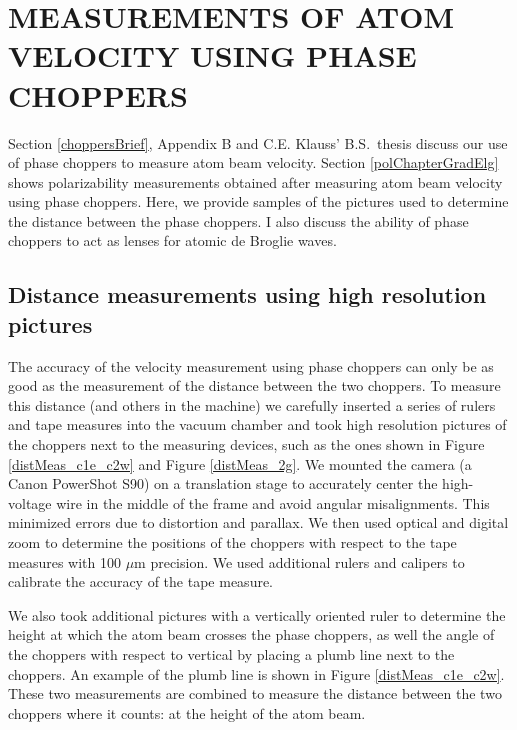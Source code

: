\chapter{MEASUREMENTS OF ATOM VELOCITY USING PHASE CHOPPERS}
\label{choppersChapter}

Section \ref{choppersBrief}, Appendix B and C.E. Klauss' B.S.~thesis \cite{Kla11} discuss our use of phase choppers to measure atom beam velocity. Section \ref{polChapterGradElg} shows polarizability measurements obtained after measuring atom beam velocity using phase choppers. Here, we provide samples of the pictures used to determine the distance between the phase choppers. I also discuss the ability of phase choppers to act as lenses for atomic de Broglie waves.




\section{Distance measurements using high resolution pictures}
\label{distMeasurements}
The accuracy of the velocity measurement using phase choppers can only be as good as the measurement of the distance between the two choppers. To measure this distance (and others in the machine) we carefully inserted a series of rulers and tape measures into the vacuum chamber and took high resolution pictures of the choppers next to the measuring devices, such as the ones shown in Figure \ref{distMeas_c1e_c2w} and Figure \ref{distMeas_2g}. We mounted the camera (a Canon PowerShot S90) on a translation stage to accurately center the high-voltage wire in the middle of the frame and avoid angular misalignments. This minimized errors due to distortion and parallax. We then used optical and digital zoom to determine the positions of the choppers with respect to the tape measures with 100 $\mu$m precision. We used additional rulers and calipers to calibrate the accuracy of the tape measure.


We also took additional pictures with a vertically oriented ruler to determine the height at which the atom beam crosses the phase choppers, as well the angle of the choppers with respect to vertical by placing a plumb line next to the choppers. An example of the plumb line is shown in Figure \ref{distMeas_c1e_c2w}. These two measurements are combined to measure the distance between the two choppers where it counts: at the height of the atom beam. 


